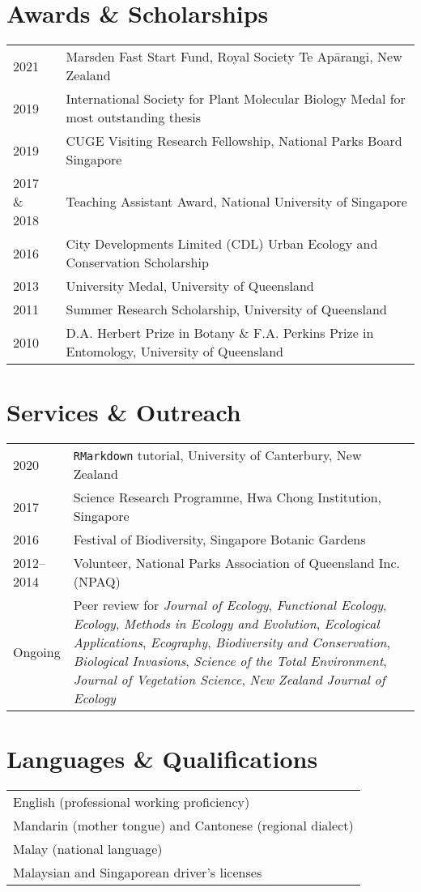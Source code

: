 \documentclass[a4paper]{article}
\begin{document}
\section*{Awards \& Scholarships}
\begin{tabular}{p{0.13\linewidth} p{0.87\linewidth}}
2021 & Marsden Fast Start Fund, Royal Society Te Ap\=arangi, New Zealand \\
2019 & International Society for Plant Molecular Biology Medal for most outstanding thesis \\
2019 & CUGE Visiting Research Fellowship, National Parks Board Singapore \\
2017 \& 2018 & Teaching Assistant Award, National University of Singapore \\
2016 & City Developments Limited (CDL) Urban Ecology and Conservation Scholarship \\
2013 & University Medal, University of Queensland \\
2011 & Summer Research Scholarship, University of Queensland \\
2010 & D.A. Herbert Prize in Botany \& F.A. Perkins Prize in Entomology, University of Queensland 
\end{tabular}


\section*{Services \& Outreach}
\begin{tabular}{p{0.13\linewidth} p{0.87\linewidth}}
2020 & \texttt{RMarkdown} tutorial, University of Canterbury, New Zealand \\
2017 & Science Research Programme, Hwa Chong Institution, Singapore \\
2016 & Festival of Biodiversity, Singapore Botanic Gardens \\
2012--2014 & Volunteer, National Parks Association of Queensland Inc. (NPAQ) \\
Ongoing & Peer review for \textit{Journal of Ecology}, \textit{Functional Ecology}, \textit{Ecology}, \textit{Methods in Ecology and Evolution}, \textit{Ecological Applications}, \textit{Ecography}, \textit{Biodiversity and Conservation}, \textit{Biological Invasions}, \textit{Science of the Total Environment}, \textit{Journal of Vegetation Science}, \textit{New Zealand Journal of Ecology}\\
\end{tabular}


\section*{Languages \& Qualifications}
\begin{tabular}{p{\linewidth}}
English (professional working proficiency) \\
Mandarin (mother tongue) and Cantonese (regional dialect) \\
Malay (national language) \\
Malaysian and Singaporean driver's licenses \\
\end{tabular}
\end{document}
